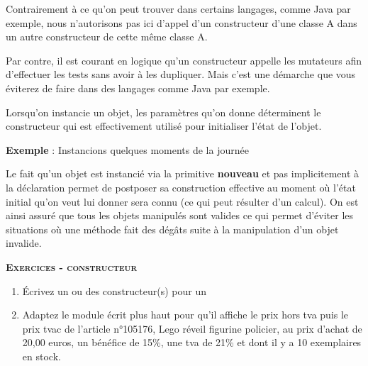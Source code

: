 
Contrairement à ce qu'on peut trouver dans certains langages, 
comme Java par exemple, nous n'autorisons pas ici d'appel 
d'un constructeur d'une classe A dans un autre constructeur 
de cette même classe A.

Par contre, il est courant en logique qu'un constructeur 
appelle les mutateurs afin d'effectuer les tests sans 
avoir à les dupliquer.
Mais c'est une démarche que vous éviterez de faire dans
des langages comme Java par exemple.

Lorsqu'on instancie un objet, les paramètres
qu'on donne déterminent le constructeur qui est
effectivement utilisé pour initialiser l'état de
l'objet.

{
\textbf{Exemple} : Instancions quelques moments de la journée}


Le fait qu'un objet est instancié via la primitive
\textbf{nouveau} et pas implicitement à la déclaration permet de
postposer sa construction effective au moment où
l'état initial qu'on veut lui donner
sera connu (ce qui peut résulter d'un calcul). On est
ainsi assuré que tous les objets manipulés sont valides ce qui permet
d’éviter les situations où une méthode fait des dégâts suite à la
manipulation d’un objet invalide.

{\sffamily\bfseries\scshape
Exercices - constructeur}

\begin{enumerate}
	\item {
		Écrivez un ou des constructeur(s) pour un }
	\item {
		Adaptez le module écrit plus haut pour qu'il affiche le prix hors tva
		puis le prix tvac de l'article n°105176, Lego réveil figurine policier, 
		au prix d'achat de 20,00 euros, un bénéfice de 15\%, une tva de 21\% et 
		dont il y a 10 exemplaires en stock.}
\end{enumerate}


